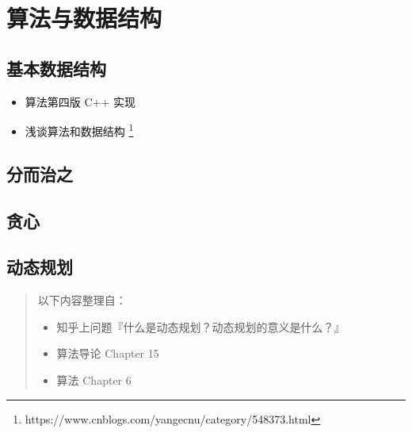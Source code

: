 \chapter{算法与数据结构}\label{chap:algorithms}

\begin{intro}

\end{intro}

\section{基本数据结构}\label{sec:primary-data-structures}

\begin{itemize}
\item 算法第四版 C++ 实现
\item 浅谈算法和数据结构%
  \footnote{https://www.cnblogs.com/yangecnu/category/548373.html}%
\end{itemize}

\section{分而治之}\label{sec:divide-and-conquer}


\section{贪心}\label{sec:greedy}

\subsection{}

\subsection{}


\section{动态规划}\label{sec:dynamic-programming}

\begin{quotation}
以下内容整理自：

\begin{itemize}
  \item 知乎上问题『什么是动态规划？动态规划的意义是什么？』
  \item 算法导论 Chapter 15 %
  \item 算法 Chapter 6 %
\end{itemize}
\end{quotation}

